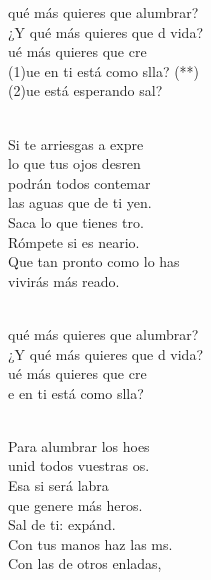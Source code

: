 \documentclass[12pt]{article}
\begin{document}
\begin{multicols*}{2}
\begin{cancion}%
	\begin{chorus}%
	 qué más quieres que alumbrar?\\
	¿Y qué más quieres que d vida?\\
	ué más quieres que cre \\
	(1)ue en ti está como slla? (**)\\
	(2)ue está esperando sal?\\
	\end{chorus}%
	\jump\\
	Si te arriesgas a expre \\
	lo que tus ojos desren\\
	podrán todos contemar\\
	las aguas que de ti yen.\\
	Saca lo que tienes tro. \\
	Rómpete si es neario.\\
	Que tan pronto como lo has \\
	vivirás más reado.\\\jump\\
	\begin{chorus}%
	 qué más quieres que alumbrar?\\
	¿Y qué más quieres que d vida?\\
	ué más quieres que cre \\
	e en ti está como slla?\\
	\end{chorus}%
	\jump\\
	Para alumbrar los hoes \\
	unid todos vuestras os.\\
	Esa si será labra\\
	que genere más heros.\\
	Sal de ti: expánd. \\
	Con tus manos haz las ms.\\
	Con las de otros enladas,\\

\end{cancion}
\end{multicols*}
\end{document}
